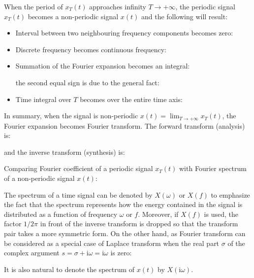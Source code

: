 	
	When the period of $x_T(t)$ approaches infinity $T \rightarrow +\infty $, the 
	periodic signal $x_T(t)$ becomes a non-periodic signal $x(t)$ and the following 
	will result:
	\begin{itemize}
	
	\item Interval between two neighbouring frequency components becomes zero:
	
	
	\item Discrete frequency becomes continuous frequency:
	
	
	\item Summation of the Fourier expansion becomes an integral:
	
	the second equal sign is due to the general fact:
	
	
	\item Time integral over $T$ becomes over the entire time axis:
	
	\end{itemize}
	
	In summary, when the signal is non-periodic $x(t)=\lim_{T\rightarrow +\infty}x_T(t)$, the Fourier expansion becomes Fourier transform. The forward transform (analysis) is:
	
	and the inverse transform (synthesis) is:
	
	
	Comparing Fourier coefficient of a periodic signal $x_T(t)$ with Fourier spectrum of a non-periodic signal $x(t)$:
	
		
	The spectrum of a time signal can be denoted by $X(\omega)$ or $X(f)$ to emphasize the fact that the spectrum represents how the energy contained in the signal is distributed as a function of frequency $\omega$ or $f$. Moreover, if $X(f)$ is used, the factor $1/2\pi$ in front of the inverse transform is dropped so that the transform pair takes a more symmetric form. On the other hand, as Fourier transform can be considered as a special case of Laplace transform when the real part $\sigma$ of the complex argument $s=\sigma+\mathrm{i}\omega=\mathrm{i}\omega$ is zero:
	
	It is also natural to denote the spectrum of $x(t)$ by $X(\mathrm{i}\omega)$.
	
